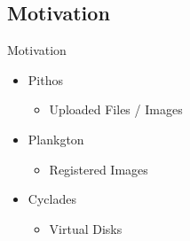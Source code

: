 \documentclass[utf8]{beamer}
\begin{document}
\subsection{Motivation}

\begin{frame}{Motivation}
  \begin{itemize}
  \item Pithos
    \begin{itemize}
      \item Uploaded Files / Images
    \end{itemize}
  \item Plankgton
    \begin{itemize}
      \item Registered Images
    \end{itemize}
  \item Cyclades
    \begin{itemize}
      \item Virtual Disks
    \end{itemize}
  \end{itemize}
\end{frame}
\end{document}
